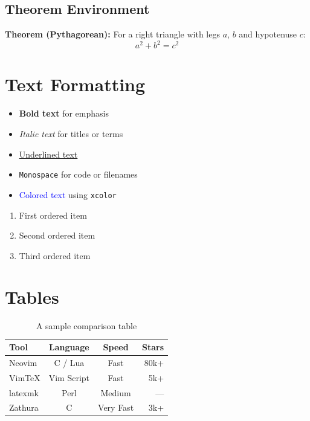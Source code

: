 \documentclass[12pt, a4paper]{article}
\begin{document}
\subsection{Theorem Environment}

\textbf{Theorem (Pythagorean):} For a right triangle with legs $a$, $b$
and hypotenuse $c$:
\[
	a^2 + b^2 = c^2
\]

\section{Text Formatting}

\begin{itemize}
	\item \textbf{Bold text} for emphasis
	\item \textit{Italic text} for titles or terms
	\item \underline{Underlined text}
	\item \texttt{Monospace} for code or filenames
	\item \textcolor{blue}{Colored text} using \texttt{xcolor}
\end{itemize}

\begin{enumerate}[label=\arabic*.]
	\item First ordered item
	\item Second ordered item
	\item Third ordered item
\end{enumerate}

\section{Tables}

\begin{table}[h!]
	\centering
	\caption{A sample comparison table}
	\begin{tabular}{@{} l c c r @{}}
		\toprule
		\textbf{Tool} & \textbf{Language} & \textbf{Speed} & \textbf{Stars} \\
		\midrule
		Neovim        & C / Lua           & Fast           & 80k+           \\
		VimTeX        & Vim Script        & Fast           & 5k+            \\
		latexmk       & Perl              & Medium         & ---            \\
		Zathura       & C                 & Very Fast      & 3k+            \\
		\bottomrule
	\end{tabular}
\end{table}
\end{document}
